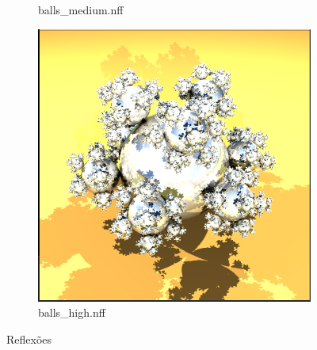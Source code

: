 \documentclass{article}
\begin{document}
\begin{figure}[h!]
\begin{subfigure}{.2\textwidth}
            \caption{balls\_medium.nff}
            \label{fig:balls_medium}
        \end{subfigure}
        \begin{subfigure}{.2\linewidth}
            \centering
            \includegraphics[width=\linewidth]{balls_high.png}
            \caption{balls\_high.nff}
            \label{fig:balls_high}
        \end{subfigure}

        \caption{Reflexões}
        \label{fig:balls}
    \end{figure}
\end{document}
